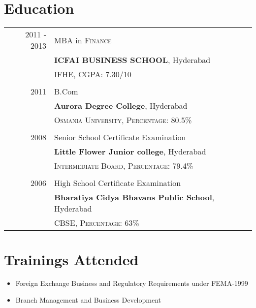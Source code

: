 \documentclass[a4paper,10pt]{article}
\begin{document}
\section{Education}
\begin{tabular}{rl}	
 \textsc{2011 - 2013} & MBA in \textsc{Finance}\\ & \textbf{ICFAI BUSINESS SCHOOL}, Hyderabad\\
&\normalsize \textsc{IFHE, CGPA}: 7.30/10\\&\\
\textsc{2011} & B.Com \\& \textbf{Aurora Degree College}, Hyderabad\\
&\normalsize \textsc{Osmania University, Percentage}: 80.5\%\\&\\
\textsc{2008} & Senior School Certificate Examination \\& \textbf{Little Flower Junior college}, Hyderabad\\
&\normalsize \textsc{Intermediate Board, Percentage}: 79.4\%\\&\\
\textsc{2006} & High School Certificate Examination \\&  \textbf{Bharatiya Cidya Bhavans Public School}, Hyderabad\\
&\normalsize \textsc{CBSE, Percentage}: 63\%
\end{tabular}




\section{Trainings Attended}
\begin{itemize}
\item Foreign Exchange Business and Regulatory Requirements under FEMA-1999
\item Branch Management and Business Development
\end{itemize}
\end{document}
